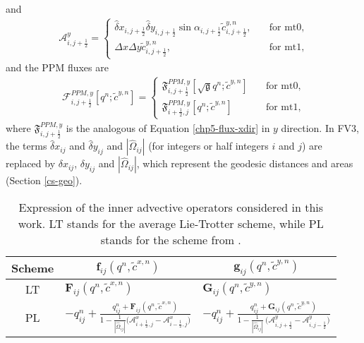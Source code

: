 and
\begin{align}
	\mathcal{A}_{i,j+\frac{1}{2}}^y= 
	\begin{cases}
		\hat{\delta} x_{i,j+\frac{1}{2}}  \hat{\delta} y_{i,j+\frac{1}{2}} 
		\sin{\alpha_{i,j+\frac{1}{2}}}
		{\tilde{c}}_{i,j+\frac{1}{2}}^{y,n},
		\quad &\text{for mt0},\\
		{\Delta x}{\Delta y}{\tilde{c}}_{i,j+\frac{1}{2}}^{y,n},
		\quad &\text{for mt1},
	\end{cases}
\end{align}
and the PPM fluxes are
\begin{align}
	\mathcal{F}_{i,j+\frac{1}{2}}^{PPM,y} [{{q}^n;\tilde{c}^{y,n}}]= 
	\begin{cases}
		\mathfrak{F}_{i,j+\frac{1}{2}}^{PPM,y}[{{\sqrt{\mathfrak{g}}q}^n;\tilde{c}^{y,n}}]
		\quad &\text{for mt0},\\
		\mathfrak{F}_{i+\frac{1}{2},j}^{PPM,y}[{{q}^n;\tilde{c}^{y,n}}]
		\quad &\text{for mt1},
	\end{cases}
\end{align}
where $\mathfrak{F}_{i,j+\frac{1}{2}}^{PPM,y}$ is the analogous of Equation \eqref{chp5-flux-xdir} in $y$ direction.
In FV3, the terms ${\hat{\delta} x_{ij}}$ and ${\hat{\delta} y_{ij}}$ and $|\hat{\Omega}_{ij}|$ (for integers or half integers $i$ and $j$)
are replaced by ${{\delta} x_{ij}}$, ${{\delta} y_{ij}}$ and $|\hat{\Omega}_{ij}|$,
which represent the geodesic distances and areas (Section \ref{cs-geo}).
\begin{table}[!h]
	\begin{tabular}{|c|l|l|}
		\hline
		Scheme & \multicolumn{1}{c|}{$\mathbf{f}_{ij}(q^n, \tilde{c}^{x,n})$}
		& \multicolumn{1}{c|}{$\mathbf{g}_{ij}(q^n, \tilde{c}^{y,n})$} \\ \hline
		LT   & $\mathbf{F}_{ij}(q^n,\tilde{c}^{x,n})$ 
		& $\mathbf{G}_{ij}(q^n,\tilde{c}^{y,n})$ \\ \hline
		PL   & $-q_{ij}^n +
		\frac{q_{ij}^n  + \mathbf{F}_{ij}(q^n,\tilde{c}^{x,n})}
		{1 - \frac{1}{|\hat{\Omega}_{ij}|}\big(\mathcal{A}_{i+\frac{1}{2},j}^{x} - \mathcal{A}_{i-\frac{1}{2},j}^{x}\big)}$
		& $-q_{ij}^n +
		\frac{q_{ij}^n  + \mathbf{G}_{ij}(q^n,\tilde{c}^{y,n})}
		{1 - \frac{1}{|\hat{\Omega}_{ij}|}\ \big(\mathcal{A}_{i,j+\frac{1}{2}}^{y} - \mathcal{A}_{i,j-\frac{1}{2}}^{y}\big)}$
		\\ \hline
	\end{tabular}
	\caption{Expression of the inner advective operators considered in this work.
		LT stands for the average Lie-Trotter  scheme, while PL stands for the scheme from \citet{putman:2007}.}
	\label{chp-csfv-tab1}
\end{table}

